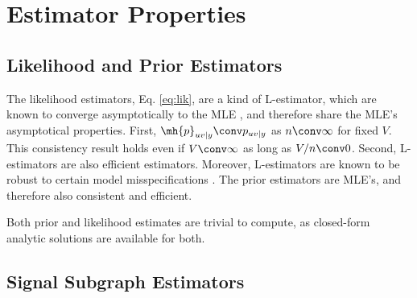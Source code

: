 \documentclass[10pt,journal,cspaper,compsoc]{IEEEtran}
\begin{document}
\section{Estimator Properties} %
\label{sec:results}

% 

\subsection{Likelihood and Prior Estimators} %
\label{ssub:subsubsection_name4}


The likelihood estimators, Eq. \eqref{eq:lik}, are a kind of L-estimator, which are known to converge asymptotically to the MLE \cite{Huber1981}, and therefore share the MLE's asymptotical properties. First, $\mh{p}_{uv|y} \conv p_{uv|y}$ as $n \conv \infty$ for fixed $V$. This consistency result holds even if  $V \conv \infty$ as long as $V/n \conv 0$.  Second, L-estimators are also efficient estimators. Moreover, L-estimators are known to be robust to certain model misspecifications \cite{Huber1981}. The prior estimators are MLE's, and therefore also consistent and efficient.



Both prior and likelihood estimates are trivial to compute, as closed-form analytic solutions are available for both.  %

\subsection{Signal Subgraph Estimators} %
\label{ssub:subsubsection_name5}
\end{document}
